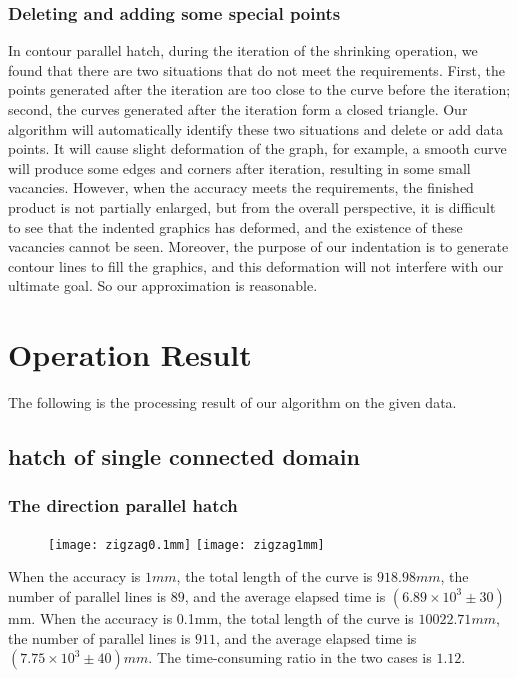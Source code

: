\documentclass{apmcmthesis}
\begin{document}
\subsubsection{Deleting and adding some special points}
In contour parallel hatch, during the iteration of the shrinking operation, we found that there are two situations that do not meet the requirements. First, the points generated after the iteration are too close to the curve before the iteration; second, the curves generated after the iteration form a closed triangle. Our algorithm will automatically identify these two situations and delete or add data points. It will cause slight deformation of the graph, for example, a smooth curve will produce some edges and corners after iteration, resulting in some small vacancies. However, when the accuracy meets the requirements, the finished product is not partially enlarged, but from the overall perspective, it is difficult to see that the indented graphics has deformed, and the existence of these vacancies cannot be seen. Moreover, the purpose of our indentation is to generate contour lines to fill the graphics, and this deformation will not interfere with our ultimate goal. So our approximation is reasonable.




\section{Operation Result}
The following is the processing result of our algorithm on the given data.

\subsection{hatch of single connected domain}


\subsubsection{The direction parallel hatch}


\begin{figure}[!ht]
    \centering
    \texttt{[image: zigzag0.1mm]} \quad \texttt{[image: zigzag1mm]}
    \caption{}
    \caption{}
\end{figure}

When the accuracy is $1mm$, the total length of the curve is $918.98mm$, the number of parallel lines is $89$, and the average elapsed time is $(6.89\times 10^3\pm 30)$ mm. When the accuracy is 0.1mm, the total length of the curve is $10022.71mm$, the number of parallel lines is $911$, and the average elapsed time is $(7.75\times 10^3\pm 40) mm$. The time-consuming ratio in the two cases is $1.12$.
\end{document}
